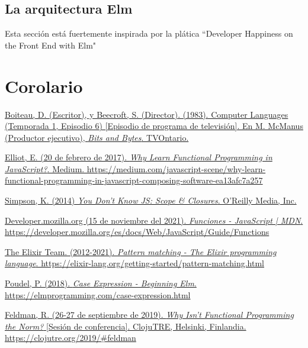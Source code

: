 \documentclass{article}
\begin{document}
\subsection{La arquitectura Elm}
Esta sección está fuertemente inspirada por la plática ``Developer Happiness on the Front End with Elm"\cite{developer-happiness-elm}


\section{Corolario}


\pagebreak
\begin{thebibliography}{99}
 \href{https://youtu.be/_C5AHaS1mOA}{Boiteau, D. (Escritor), y Beecroft, S. (Director). (1983). Computer Languages (Temporada 1, Episodio 6) [Episodio de programa de televisión]. En M. McManus (Productor ejecutivo), \textit{Bits and Bytes}. TVOntario.}

 \href{https://medium.com/javascript-scene/why-learn-functional-programming-in-javascript-composing-software-ea13afc7a257}{Elliot, E. (20 de febrero de 2017). \textit{Why Learn Functional Programming in JavaScript?}. Medium. https://medium.com/javascript-scene/why-learn-functional-programming-in-javascript-composing-software-ea13afc7a257}

 \href{https://github.com/getify/You-Dont-Know-JS/blob/1st-ed/scope\%20\&\%20closures/README.md\#you-dont-know-js-scope--closures}{Simpson, K. (2014) \textit{You Don't Know JS: Scope \& Closures}. O'Reilly Media, Inc.}

 \href{https://developer.mozilla.org/es/docs/Web/JavaScript/Guide/Functions}{Developer.mozilla.org (15 de noviembre del 2021). \textit{Funciones - JavaScript | MDN}. https://developer.mozilla.org/es/docs/Web/JavaScript/Guide/Functions}

 \href{https://elixir-lang.org/getting-started/pattern-matching.html}{The Elixir Team. (2012-2021). \textit{Pattern matching - The Elixir programming language}. https://elixir-lang.org/getting-started/pattern-matching.html}

 \href{https://elmprogramming.com/case-expression.html}{Poudel, P. (2018). \textit{Case Expression - Beginning Elm}. https://elmprogramming.com/case-expression.html}

 \href{https://clojutre.org/2019/#feldman}{Feldman, R. (26-27 de septiembre de 2019). \textit{Why Isn't Functional Programming the Norm?} [Sesión de conferencia]. ClojuTRE, Helsinki, Finlandia. https://clojutre.org/2019/\#feldman}


\end{thebibliography}
\end{document}
